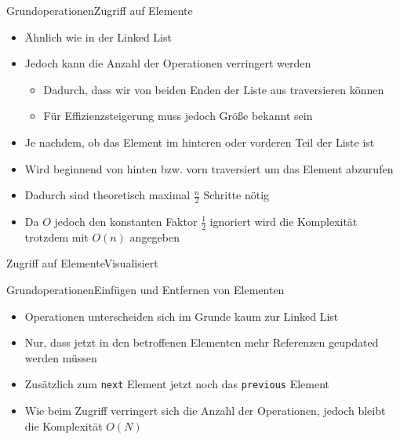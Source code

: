 \begin{frame}{Grundoperationen}{Zugriff auf Elemente}
	\begin{itemize}
		\item Ähnlich wie in der Linked List
		\item Jedoch kann die Anzahl der Operationen verringert werden
		\begin{itemize}
			\item Dadurch, dass wir von beiden Enden der Liste aus traversieren können
			\item Für Effizienzsteigerung muss jedoch Größe bekannt sein
		\end{itemize}
		\item Je nachdem, ob das Element im hinteren oder vorderen Teil der Liste ist
		\item Wird beginnend von hinten bzw. vorn traversiert um das Element abzurufen
		\item Dadurch sind theoretisch maximal $\frac{n}{2}$ Schritte nötig
		\item Da $O$ jedoch den konstanten Faktor $\frac{1}{2}$ ignoriert wird die Komplexität trotzdem mit $O(n)$ angegeben
	\end{itemize}
\end{frame}

\begin{frame}{Zugriff auf Elemente}{Visualisiert}
\end{frame}

\begin{frame}{Grundoperationen}{Einfügen und Entfernen von Elementen}
	\begin{itemize}
		\item Operationen unterscheiden sich im Grunde kaum zur Linked List
		\item Nur, dass jetzt in den betroffenen Elementen mehr Referenzen geupdated werden müssen
		\item Zusätzlich zum \texttt{next} Element jetzt noch das \texttt{previous} Element
		\item Wie beim Zugriff verringert sich die Anzahl der Operationen, jedoch bleibt die Komplexität $O(N)$
	\end{itemize}
\end{frame}

